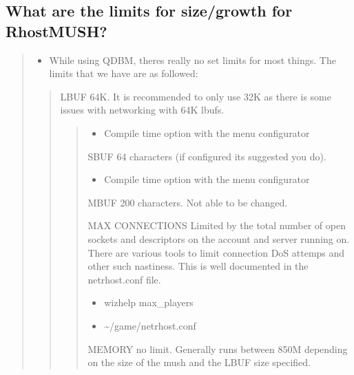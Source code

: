 \documentclass[letterpaper,10pt,english]{sphinxmanual}
\begin{document}
\subsection{What are the limits for size/growth for RhostMUSH?}
\label{\detokenize{features:what-are-the-limits-for-size-growth-for-rhostmush}}\begin{quote}
\begin{itemize}
\item {} 
\sphinxAtStartPar
While using QDBM, there\textquotesingle{}s really no set limits for most things.
The limits that we have are as followed:

\end{itemize}
\begin{quote}

\sphinxAtStartPar
LBUF \sphinxhyphen{} 64K.  It is recommended to only use 32K as there is some issues with networking with 64K lbufs.
\begin{quote}
\begin{itemize}
\item {} 
\sphinxAtStartPar
Compile time option with the menu configurator

\end{itemize}

\sphinxAtStartPar
SBUF \sphinxhyphen{} 64 characters (if configured \sphinxhyphen{}\sphinxhyphen{} it\textquotesingle{}s suggested you do).
\begin{itemize}
\item {} 
\sphinxAtStartPar
Compile time option with the menu configurator

\end{itemize}

\sphinxAtStartPar
MBUF \sphinxhyphen{} 200 characters.  Not able to be changed.

\sphinxAtStartPar
MAX CONNECTIONS \sphinxhyphen{} Limited by the total number of open sockets and descriptors on the account and server running on.  There are various tools to limit connection DoS attemps and other such nastiness.  This is well documented in the netrhost.conf file.
\begin{itemize}
\item {} 
\sphinxAtStartPar
wizhelp max\_players

\item {} 
\sphinxAtStartPar
\textasciitilde{}/game/netrhost.conf

\end{itemize}

\sphinxAtStartPar
MEMORY \sphinxhyphen{} no limit.  Generally runs between 8\sphinxhyphen{}50M depending on the size of the mush and the LBUF size specified.


\end{quote}
\end{quote}
\end{quote}
\end{document}

